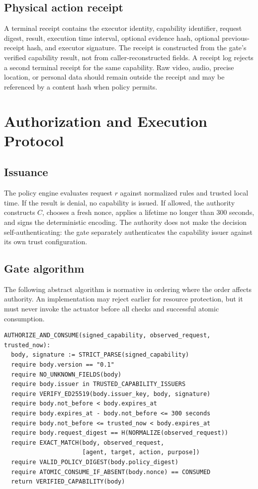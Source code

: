 \documentclass[10.5pt,a4paper]{article}
\begin{document}
\subsection{Physical action receipt}

A terminal receipt contains the executor identity, capability identifier, request digest,
result, execution time interval, optional evidence hash, optional previous-receipt hash, and
executor signature. The receipt is constructed from the gate's verified capability result, not
from caller-reconstructed fields. A receipt log rejects a second terminal receipt for the same
capability. Raw video, audio, precise location, or personal data should remain outside the
receipt and may be referenced by a content hash when policy permits.

\section{Authorization and Execution Protocol}

\subsection{Issuance}

The policy engine evaluates request $r$ against normalized rules and trusted local time. If the
result is denial, no capability is issued. If allowed, the authority constructs $C$, chooses a
fresh nonce, applies a lifetime no longer than 300 seconds, and signs the deterministic encoding.
The authority does not make the decision self-authenticating: the gate separately authenticates
the capability issuer against its own trust configuration.

\subsection{Gate algorithm}

The following abstract algorithm is normative in ordering where the order affects authority.
An implementation may reject earlier for resource protection, but it must never invoke the
actuator before all checks and successful atomic consumption.

\begin{lstlisting}[style=kgp]
AUTHORIZE_AND_CONSUME(signed_capability, observed_request, trusted_now):
  body, signature := STRICT_PARSE(signed_capability)
  require body.version == "0.1"
  require NO_UNKNOWN_FIELDS(body)
  require body.issuer in TRUSTED_CAPABILITY_ISSUERS
  require VERIFY_ED25519(body.issuer_key, body, signature)
  require body.not_before < body.expires_at
  require body.expires_at - body.not_before <= 300 seconds
  require body.not_before <= trusted_now < body.expires_at
  require body.request_digest == H(NORMALIZE(observed_request))
  require EXACT_MATCH(body, observed_request,
                      [agent, target, action, purpose])
  require VALID_POLICY_DIGEST(body.policy_digest)
  require ATOMIC_CONSUME_IF_ABSENT(body.nonce) == CONSUMED
  return VERIFIED_CAPABILITY(body)
\end{lstlisting}
\end{document}
